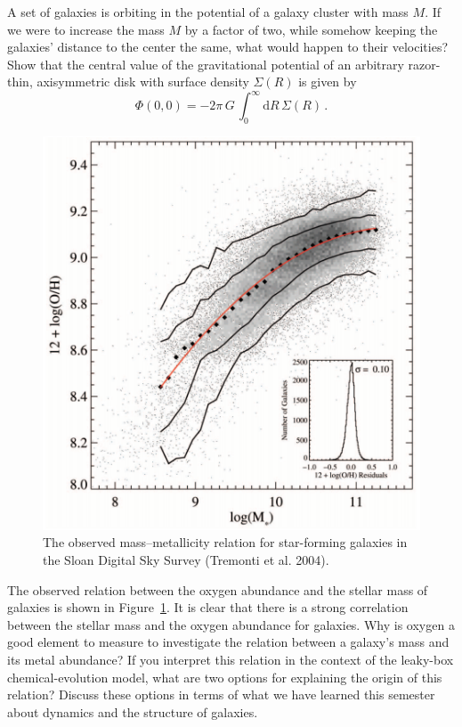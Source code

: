 \documentclass[12pt]{article}
\begin{document}
 A set of galaxies is orbiting in the potential of a galaxy cluster with mass 
$M$. If we were to increase the mass $M$ by a factor of two, while somehow keeping the 
galaxies' distance to the center the same, what would happen to their velocities?\\

 Show that the central value of the gravitational potential of an 
arbitrary razor-thin, axisymmetric disk with surface density $\Sigma(R)$ is given by
\begin{equation*}
\Phi(0,0) = -2\pi\,G\,\int_0^\infty\mathrm{d} R \,\Sigma(R)\,.
\end{equation*}

\begin{figure}[htp]
    \includegraphics[width=\textwidth]{tremonti.png}
    \caption{The observed mass--metallicity relation for star-forming
      galaxies in the Sloan Digital Sky Survey (Tremonti et
      al. 2004).}\label{fig:tremonti}
    \end{figure}

 The observed relation between the oxygen abundance and the stellar 
mass of galaxies is shown in Figure~\ref{fig:tremonti}. It is clear that there is a strong
correlation between the stellar mass and the oxygen abundance for galaxies. Why is 
oxygen a good element to measure to investigate the relation between a galaxy's mass and 
its metal abundance? If you interpret this relation in the context of 
the leaky-box chemical-evolution model, what are two options for
explaining the origin of this relation? Discuss these options in terms
of what we have learned this semester about dynamics and the structure
of galaxies.\\
\end{document}
